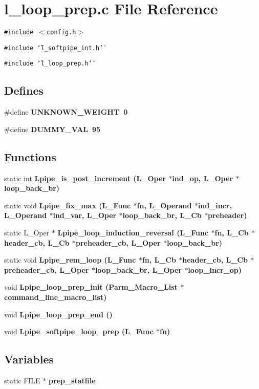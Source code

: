 \section{l\_\-loop\_\-prep.c File Reference}
\label{l__loop__prep_8c}
{\tt \#include $<$config.h$>$}\par
{\tt \#include \char`\"{}l\_\-softpipe\_\-int.h\char`\"{}}\par
{\tt \#include \char`\"{}l\_\-loop\_\-prep.h\char`\"{}}\par
\subsection*{Defines}
\begin{CompactItemize}
\item 
\#define \bf{UNKNOWN\_\-WEIGHT}~0
\item 
\#define \bf{DUMMY\_\-VAL}~95
\end{CompactItemize}
\subsection*{Functions}
\begin{CompactItemize}
\item 
static int \bf{Lpipe\_\-is\_\-post\_\-increment} (L\_\-Oper $\ast$ind\_\-op, L\_\-Oper $\ast$loop\_\-back\_\-br)
\item 
static void \bf{Lpipe\_\-fix\_\-max} (L\_\-Func $\ast$fn, L\_\-Operand $\ast$ind\_\-incr, L\_\-Operand $\ast$ind\_\-var, L\_\-Oper $\ast$loop\_\-back\_\-br, L\_\-Cb $\ast$preheader)
\item 
static L\_\-Oper $\ast$ \bf{Lpipe\_\-loop\_\-induction\_\-reversal} (L\_\-Func $\ast$fn, L\_\-Cb $\ast$\bf{header\_\-cb}, L\_\-Cb $\ast$\bf{preheader\_\-cb}, L\_\-Oper $\ast$loop\_\-back\_\-br)
\item 
static void \bf{Lpipe\_\-rem\_\-loop} (L\_\-Func $\ast$fn, L\_\-Cb $\ast$\bf{header\_\-cb}, L\_\-Cb $\ast$\bf{preheader\_\-cb}, L\_\-Oper $\ast$loop\_\-back\_\-br, L\_\-Oper $\ast$loop\_\-incr\_\-op)
\item 
void \bf{Lpipe\_\-loop\_\-prep\_\-init} (Parm\_\-Macro\_\-List $\ast$command\_\-line\_\-macro\_\-list)
\item 
void \bf{Lpipe\_\-loop\_\-prep\_\-end} ()
\item 
void \bf{Lpipe\_\-softpipe\_\-loop\_\-prep} (L\_\-Func $\ast$fn)
\end{CompactItemize}
\subsection*{Variables}
\begin{CompactItemize}
\item 
static FILE $\ast$ \bf{prep\_\-statfile}
\end{CompactItemize}


